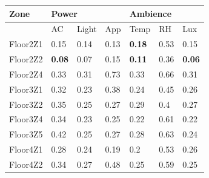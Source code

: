 \begin{table}[]
\begin{tabular}{|l|l|l|l|l|l|l|}
\hline
Zone & \multicolumn{3}{l|}{Power} & \multicolumn{3}{l|}{Ambience} \\ \hline
 &   AC  & Light   & App     & Temp     & RH    & Lux             \\ \hline
Floor2Z1 & 0.15                         & 0.14                            & 0.13                          & \textbf{0.18    }                         & 0.53                          & 0.15                     \\ \hline
Floor2Z2 & \textbf{0.08   }                      & 0.07                            & 0.15                          & \textbf{0.11    }                       & 0.36                          & \textbf{0.06     }                \\ \hline
Floor2Z4 & 0.33                         & 0.31                            & 0.73                          & 0.33                             & 0.66                          & 0.31                     \\ \hline
Floor3Z1 & 0.32                         & 0.23                            & 0.38                          & 0.24                             & 0.45                          & 0.26                     \\ \hline
Floor3Z2 & 0.35                         & 0.25                            & 0.27                          & 0.29                             & 0.4                           & 0.27                     \\ \hline
Floor3Z4 & 0.34                         & 0.23                            & 0.25                          & 0.22                             & 0.61                          & 0.22                     \\ \hline
Floor3Z5 & 0.42                         & 0.25                            & 0.27                          & 0.28                             & 0.63                          & 0.24                     \\ \hline
Floor4Z1 & 0.28                         & 0.24                            & 0.19                          & 0.2                              & 0.53                          & 0.26                     \\ \hline
Floor4Z2 & 0.34                         & 0.27                            & 0.48                          & 0.25                             & 0.59                          & 0.25                     \\ \hline

\end{tabular}
\end{table}
